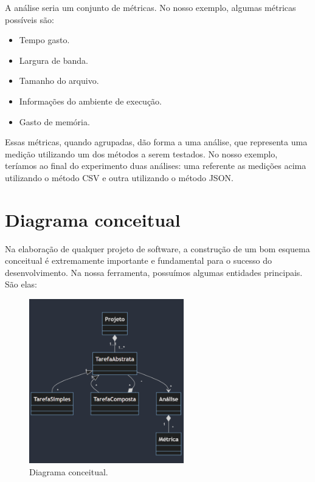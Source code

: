 \documentclass[12pt]{tcc}
\begin{document}
A análise seria um conjunto de métricas. No nosso exemplo, algumas métricas possíveis são:

\begin{itemize}
	\item Tempo gasto.
	\item Largura de banda.
	\item Tamanho do arquivo.
	\item Informações do ambiente de execução.
	\item Gasto de memória.
\end{itemize}

Essas métricas, quando agrupadas, dão forma a uma análise, que representa uma medição utilizando um dos métodos a serem testados. No nosso exemplo, teríamos ao final do experimento duas análises: uma referente as medições acima utilizando o método CSV e outra utilizando o método JSON.

\section{Diagrama conceitual}

Na elaboração de qualquer projeto de software, a construção de um bom esquema conceitual é extremamente importante e fundamental para o sucesso do desenvolvimento. Na nossa ferramenta, possuímos algumas entidades principais. São elas:

\begin{figure}[!ht]
	\centering
	\includegraphics[width=0.6\textwidth]{figures/diagrama-conceitual.png}
	\caption{Diagrama conceitual.}
	\label{fig:diag-conceitual}
\end{figure}
\end{document}
